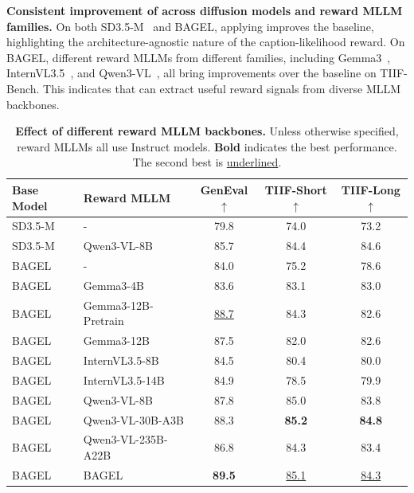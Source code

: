 \noindent \textbf{Consistent improvement of \method across diffusion models and reward MLLM families.}
On both SD3.5-M~\cite{sd3} and BAGEL, applying \method improves the baseline, 
highlighting the architecture-agnostic nature of the caption-likelihood reward. 
On BAGEL, different reward MLLMs from different families, including Gemma3~\cite{gemma3}, InternVL3.5~\cite{wang2025internvl3}, and Qwen3-VL~\cite{qwen3vl}, 
all bring improvements over the baseline on TIIF-Bench. 
This indicates that \method can extract useful reward signals from diverse MLLM backbones.
\begin{table}[t]
    \scriptsize
    \centering
    \caption{ \textbf{Effect of different reward MLLM backbones.}
    Unless otherwise specified, reward MLLMs all use Instruct models.
    \textbf{Bold} indicates the best performance. The second best is \underline{underlined}.}
    \label{tab:reward_mllm}
    \begin{tabular}{llccc}
    \toprule[1.5pt]
    \textbf{Base Model} & \textbf{Reward MLLM} & \textbf{GenEval$\uparrow$} & \textbf{TIIF-Short$\uparrow$} & \textbf{TIIF-Long$\uparrow$} \\
    \midrule
    SD3.5-M & -                       & 79.8 & 74.0 & 73.2\\
    SD3.5-M & Qwen3-VL-8B             & 85.7 & 84.4 & 84.6 \\
    \midrule
    BAGEL & -                       & 84.0 & 75.2 & 78.6 \\
    BAGEL & Gemma3-4B      & 83.6 & 83.1 & 83.0 \\
    BAGEL & Gemma3-12B-Pretrain     & \underline{88.7} & 84.3 & 82.6 \\
    BAGEL & Gemma3-12B     & 87.5 & 82.0 & 82.6 \\
    BAGEL & InternVL3.5-8B          & 84.5 & 80.4 & 80.0 \\
    BAGEL & InternVL3.5-14B         & 84.9 & 78.5 & 79.9 \\
    BAGEL & Qwen3-VL-8B             & 87.8 & 85.0 & 83.8 \\
    \rowcolor{gray!10}
    BAGEL & Qwen3-VL-30B-A3B        & 88.3 & \textbf{85.2} & \textbf{84.8} \\
    BAGEL & Qwen3-VL-235B-A22B      & 86.8 & 84.3 & 83.4 \\
    \rowcolor{gray!10}
    BAGEL & BAGEL                   & \textbf{89.5} & \underline{85.1} & \underline{84.3} \\
    \bottomrule[1.5pt]
    \end{tabular}
    \vspace{-4mm}
\end{table}


